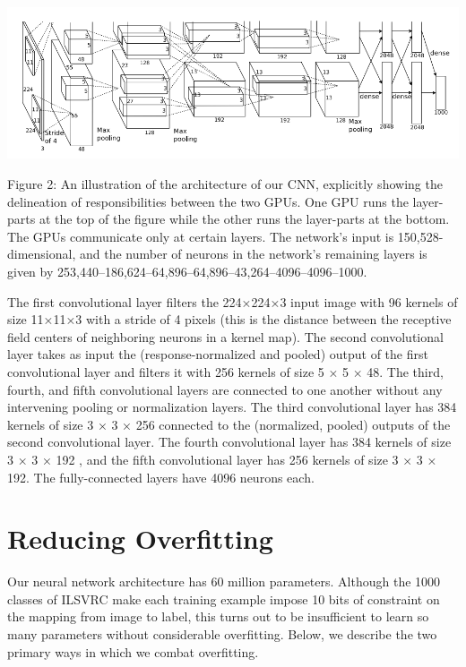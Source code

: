 \documentclass[12pt,a4paper,UTF8,twoside]{book}
\begin{document}
\begin{center}\includegraphics[width=0.7\linewidth]{img/01-02} \end{center}

Figure 2: An illustration of the architecture of our CNN, explicitly showing the delineation of responsibilities between the two GPUs. One GPU runs the layer-parts at the top of the figure while the other runs the layer-parts at the bottom. The GPUs communicate only at certain layers. The network's input is 150,528-dimensional, and the number of neurons in the network's remaining layers is given by 253,440--186,624--64,896--64,896--43,264--4096--4096--1000.

The first convolutional layer filters the 224×224×3 input image with 96 kernels of size 11×11×3 with a stride of 4 pixels (this is the distance between the receptive field centers of neighboring neurons in a kernel map). The second convolutional layer takes as input the (response-normalized and pooled) output of the first convolutional layer and filters it with 256 kernels of size 5 × 5 × 48. The third, fourth, and fifth convolutional layers are connected to one another without any intervening pooling or normalization layers. The third convolutional layer has 384 kernels of size 3 × 3 × 256 connected to the (normalized, pooled) outputs of the second convolutional layer. The fourth convolutional layer has 384 kernels of size 3 × 3 × 192 , and the fifth convolutional layer has 256 kernels of size 3 × 3 × 192. The fully-connected layers have 4096 neurons each.

\hypertarget{reducing-overfitting}{%
\section{Reducing Overfitting}\label{reducing-overfitting}}

Our neural network architecture has 60 million parameters. Although the 1000 classes of ILSVRC make each training example impose 10 bits of constraint on the mapping from image to label, this turns out to be insufficient to learn so many parameters without considerable overfitting. Below, we describe the two primary ways in which we combat overfitting.
\end{document}
